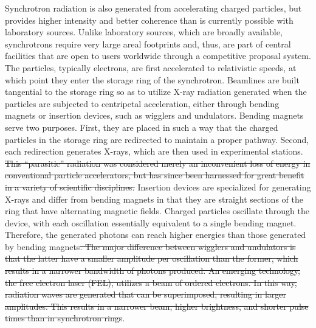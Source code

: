 \documentclass[journal=cmatex,manuscript=perspective]{achemso}
\providecommand{\DIFdeltex}[1]{{\protect\color{red}\sout{#1}}}                      %
\providecommand{\DIFdelbegin}{} %
\providecommand{\DIFdelend}{} %
\providecommand{\DIFdel}[1]{\texorpdfstring{\DIFdeltex{#1}}{}} %
\begin{document}
Synchrotron radiation is also generated from accelerating charged
particles, but provides higher intensity and better coherence than is
currently possible with laboratory sources. Unlike laboratory sources,
which are broadly available, synchrotrons require very large areal
footprints and, thus, are part of central facilities that are open to
users worldwide through a competitive proposal system. The particles,
typically electrons, are first accelerated to relativistic speeds, at
which point they enter the storage ring of the synchrotron. Beamlines
are built tangential to the storage ring so as to utilize X-ray
radiation generated when the particles are subjected to centripetal
acceleration, either through bending magnets or insertion devices,
such as wigglers and undulators. Bending magnets serve two
purposes. First, they are placed in such a way that the charged
particles in the storage ring are redirected to maintain a proper
pathway. Second, each redirection generates X-rays, which are then
used in experimental stations. \DIFdelbegin \DIFdel{This ``parasitic'' radiation was
considered merely an inconvenient loss of energy in conventional
particle accelerators, but has since been harnessed for great benefit
in a variety of scientific disciplines. }\DIFdelend Insertion devices are specialized for
generating X-rays and differ from bending magnets in that they are
straight sections of the ring that have alternating magnetic
fields. Charged particles oscillate through the device, with each
oscillation essentially equivalent to a single bending
magnet. Therefore, the generated photons can reach higher energies
than those generated by bending magnets\DIFdelbegin \DIFdel{. The major difference between
wigglers and undulators is that the latter have a smaller amplitude
per oscillation than the former, which results in a narrower bandwidth
of photons produced. An emerging technology, the free electron laser
(FEL), utilizes a beam of ordered electrons. In this way, radiation
waves are generated that can be superimposed, resulting in larger
amplitudes. This results in a narrower beam, higher brightness, and
shorter pulse times than in synchrotron
rings}\DIFdelend \cite{synchrotronradiation}.
\end{document}
